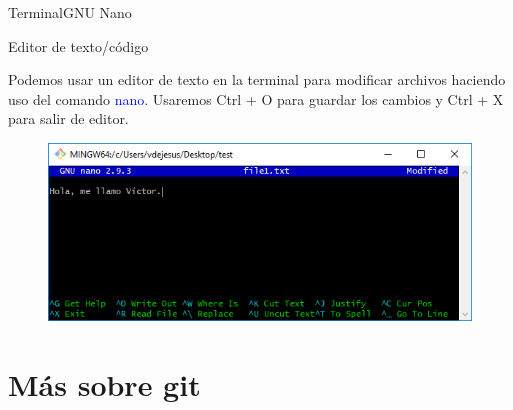 \documentclass[10pt]{beamer}
\begin{document}
\begin{frame}{Terminal}{GNU Nano}

\begin{block}{Editor de texto/código}

Podemos usar un editor de texto en la terminal para modificar archivos haciendo uso del comando \textcolor{blue}{nano}. Usaremos Ctrl + O para guardar los cambios y Ctrl + X para salir de editor.



\begin{figure}[h!]
\centering
\includegraphics [scale=0.55]{nano}
\label{fig:git}
\end{figure}

\end{block}

\end{frame}

\section{Más sobre git}
\end{document}
